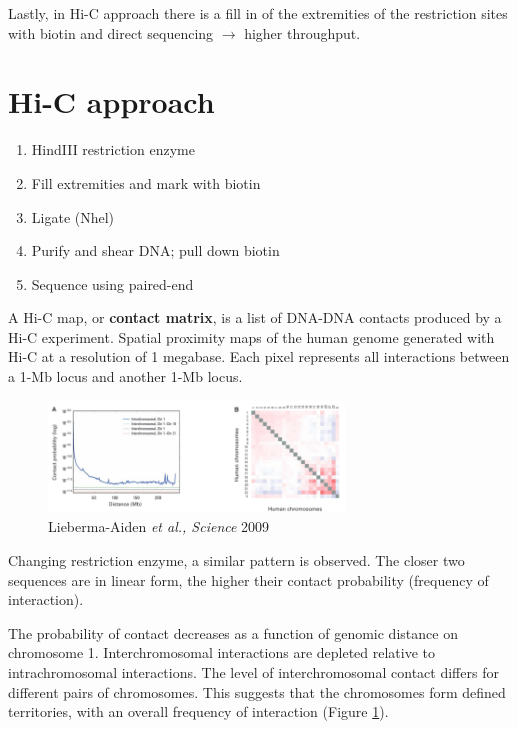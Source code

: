 Lastly, in Hi-C approach there is a fill in of the extremities of the restriction sites with biotin and direct sequencing $\rightarrow$ higher throughput.

\hypertarget{hi-c-approach}{%
\section{Hi-C approach}\label{hi-c-approach}}

\begin{enumerate}
\def\labelenumi{\arabic{enumi}.}
\tightlist
\item
  HindIII restriction enzyme
\item
  Fill extremities and mark with biotin
\item
  Ligate (Nhel)
\item
  Purify and shear DNA; pull down biotin
\item
  Sequence using paired-end
\end{enumerate}

A Hi-C map, or \textbf{contact matrix}, is a list of DNA-DNA contacts produced by a Hi-C experiment. Spatial proximity maps of the human genome generated with Hi-C at a resolution of 1 megabase. Each pixel represents all interactions between a 1-Mb locus and another 1-Mb locus.

\begin{figure}
\centering
\includegraphics[width=0.7\textwidth]{../_resources/Screenshot_2022-10-25_at_11-47-30.png}
\caption{Lieberma-Aiden \emph{et al., Science} 2009}
\label{fig:int}
\end{figure}

Changing restriction enzyme, a similar pattern is observed. The closer two sequences are in linear form, the higher their contact probability (frequency of interaction).

The probability of contact decreases as a function of genomic distance on chromosome 1. Interchromosomal interactions are depleted relative to intrachromosomal interactions. The level of interchromosomal contact differs for different pairs of chromosomes. This suggests that the chromosomes form defined territories, with an overall frequency of interaction (Figure \ref{fig:int}).

